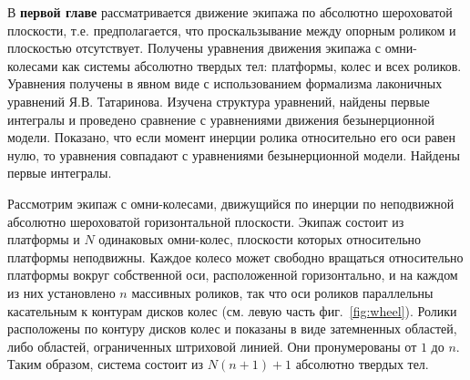 
В \textbf{первой главе} рассматривается движение экипажа по абсолютно шероховатой плоскости, т.е. предполагается, что проскальзывание между опорным роликом и плоскостью отсутствует. Получены уравнения движения экипажа с омни-колесами как системы абсолютно твердых тел: платформы, колес и всех роликов. Уравнения получены в явном виде с использованием формализма лаконичных уравнений Я.В. Татаринова. Изучена структура уравнений, найдены первые интегралы и проведено сравнение с уравнениями движения безынерционной модели. Показано, что если момент инерции ролика относительно его оси равен нулю, то уравнения совпадают с уравнениями безынерционной модели. Найдены первые интегралы.

Рассмотрим экипаж с омни-колесами, движущийся по инерции по неподвижной абсолютно шероховатой горизонтальной плоскости. Экипаж состоит из платформы и $N$ одинаковых омни-колес, плоскости которых относительно платформы неподвижны. Каждое колесо может свободно вращаться относительно платформы вокруг собственной оси, расположенной горизонтально, и на каждом из них установлено $n$ массивных роликов, так что оси роликов параллельны касательным к контурам дисков колес (см. левую часть фиг.~\ref{fig:wheel}). Ролики расположены по контуру дисков колес и показаны в виде затемненных областей, либо областей, ограниченных штриховой линией. Они пронумерованы от $1$ до $n$.
Таким образом, система состоит из $N(n+1) + 1$ абсолютно твердых тел. 



